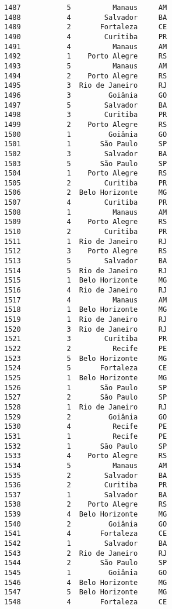 \documentclass[11pt]{article}
\begin{document}
\begin{Verbatim}[commandchars=\\\{\}]
1487           5          Manaus     AM  
1488           4        Salvador     BA  
1489           2       Fortaleza     CE  
1490           4        Curitiba     PR  
1491           4          Manaus     AM  
1492           1    Porto Alegre     RS  
1493           5          Manaus     AM  
1494           2    Porto Alegre     RS  
1495           3  Rio de Janeiro     RJ  
1496           3         Goiânia     GO  
1497           5        Salvador     BA  
1498           3        Curitiba     PR  
1499           2    Porto Alegre     RS  
1500           1         Goiânia     GO  
1501           1       São Paulo     SP  
1502           3        Salvador     BA  
1503           5       São Paulo     SP  
1504           1    Porto Alegre     RS  
1505           2        Curitiba     PR  
1506           2  Belo Horizonte     MG  
1507           4        Curitiba     PR  
1508           1          Manaus     AM  
1509           4    Porto Alegre     RS  
1510           2        Curitiba     PR  
1511           1  Rio de Janeiro     RJ  
1512           3    Porto Alegre     RS  
1513           5        Salvador     BA  
1514           5  Rio de Janeiro     RJ  
1515           1  Belo Horizonte     MG  
1516           4  Rio de Janeiro     RJ  
1517           4          Manaus     AM  
1518           1  Belo Horizonte     MG  
1519           1  Rio de Janeiro     RJ  
1520           3  Rio de Janeiro     RJ  
1521           3        Curitiba     PR  
1522           2          Recife     PE  
1523           5  Belo Horizonte     MG  
1524           5       Fortaleza     CE  
1525           1  Belo Horizonte     MG  
1526           1       São Paulo     SP  
1527           2       São Paulo     SP  
1528           1  Rio de Janeiro     RJ  
1529           2         Goiânia     GO  
1530           4          Recife     PE  
1531           1          Recife     PE  
1532           1       São Paulo     SP  
1533           4    Porto Alegre     RS  
1534           5          Manaus     AM  
1535           2        Salvador     BA  
1536           2        Curitiba     PR  
1537           1        Salvador     BA  
1538           2    Porto Alegre     RS  
1539           4  Belo Horizonte     MG  
1540           2         Goiânia     GO  
1541           4       Fortaleza     CE  
1542           1        Salvador     BA  
1543           2  Rio de Janeiro     RJ  
1544           2       São Paulo     SP  
1545           1         Goiânia     GO  
1546           4  Belo Horizonte     MG  
1547           5  Belo Horizonte     MG  
1548           4       Fortaleza     CE  

\end{Verbatim}
\end{document}
